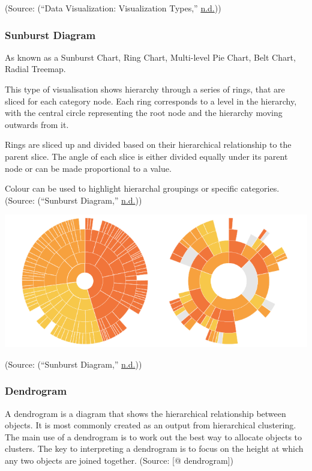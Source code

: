 \documentclass[]{book}
\begin{document}
(Source: (``Data Visualization: Visualization Types,'' \protect\hyperlink{ref-treemap}{n.d.}))

\hypertarget{sunburst-diagram}{%
\subsubsection{Sunburst Diagram}\label{sunburst-diagram}}

As known as a Sunburst Chart, Ring Chart, Multi-level Pie Chart, Belt Chart, Radial Treemap.

This type of visualisation shows hierarchy through a series of rings, that are sliced for each category node. Each ring corresponds to a level in the hierarchy, with the central circle representing the root node and the hierarchy moving outwards from it.

Rings are sliced up and divided based on their hierarchical relationship to the parent slice. The angle of each slice is either divided equally under its parent node or can be made proportional to a value.

Colour can be used to highlight hierarchal groupings or specific categories.
(Source: (``Sunburst Diagram,'' \protect\hyperlink{ref-sunburst-diag}{n.d.}))

\includegraphics{images/sunburst_diagram.png}

(Source: (``Sunburst Diagram,'' \protect\hyperlink{ref-sunburst-diag}{n.d.}))

\hypertarget{dendrogram}{%
\subsubsection{Dendrogram}\label{dendrogram}}

A dendrogram is a diagram that shows the hierarchical relationship between objects. It is most commonly created as an output from hierarchical clustering. The main use of a dendrogram is to work out the best way to allocate objects to clusters. The key to interpreting a dendrogram is to focus on the height at which any two objects are joined together.
(Source: {[}@ dendrogram{]})
\end{document}
